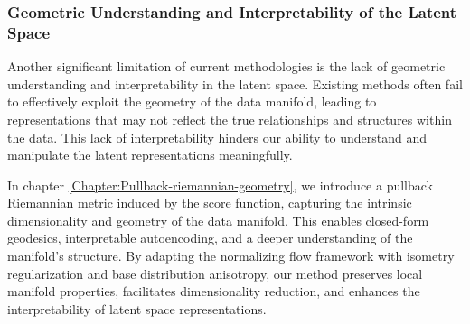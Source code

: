 \subsubsection{Geometric Understanding and Interpretability of the Latent Space}

Another significant limitation of current methodologies is the lack of geometric understanding and interpretability in the latent space. Existing methods often fail to effectively exploit the geometry of the data manifold, leading to representations that may not reflect the true relationships and structures within the data. This lack of interpretability hinders our ability to understand and manipulate the latent representations meaningfully.


In chapter \ref{Chapter:Pullback-riemannian-geometry}, we introduce a pullback Riemannian metric induced by the score function, capturing the intrinsic dimensionality and geometry of the data manifold. This enables closed-form geodesics, interpretable autoencoding, and a deeper understanding of the manifold's structure. By adapting the normalizing flow framework with isometry regularization and base distribution anisotropy, our method preserves local manifold properties, facilitates dimensionality reduction, and enhances the interpretability of latent space representations.
